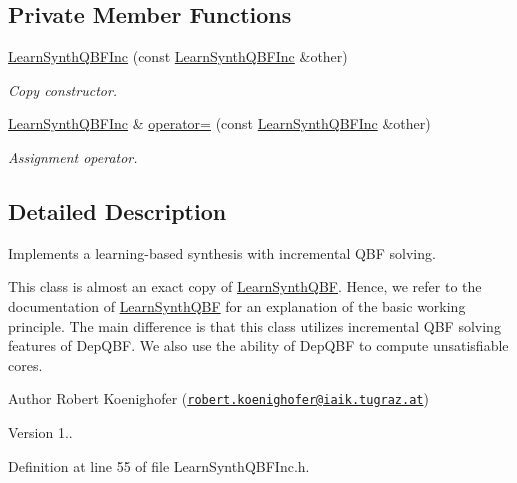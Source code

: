 \subsection*{Private Member Functions}
\begin{DoxyCompactItemize}
\item 
\hyperlink{classLearnSynthQBFInc_adbb7481fd8c287942417c9ae75b06e8b}{Learn\-Synth\-Q\-B\-F\-Inc} (const \hyperlink{classLearnSynthQBFInc}{Learn\-Synth\-Q\-B\-F\-Inc} \&other)
\begin{DoxyCompactList}\small\item\em Copy constructor. \end{DoxyCompactList}\item 
\hyperlink{classLearnSynthQBFInc}{Learn\-Synth\-Q\-B\-F\-Inc} \& \hyperlink{classLearnSynthQBFInc_a09bc59c4c8a80e064fe4535314ee2acb}{operator=} (const \hyperlink{classLearnSynthQBFInc}{Learn\-Synth\-Q\-B\-F\-Inc} \&other)
\begin{DoxyCompactList}\small\item\em Assignment operator. \end{DoxyCompactList}\end{DoxyCompactItemize}


\subsection{Detailed Description}
Implements a learning-\/based synthesis with incremental Q\-B\-F solving. 

This class is almost an exact copy of \hyperlink{classLearnSynthQBF}{Learn\-Synth\-Q\-B\-F}. Hence, we refer to the documentation of \hyperlink{classLearnSynthQBF}{Learn\-Synth\-Q\-B\-F} for an explanation of the basic working principle. The main difference is that this class utilizes incremental Q\-B\-F solving features of Dep\-Q\-B\-F. We also use the ability of Dep\-Q\-B\-F to compute unsatisfiable cores.

\begin{DoxyAuthor}{Author}
Robert Koenighofer (\href{mailto:robert.koenighofer@iaik.tugraz.at}{\tt robert.\-koenighofer@iaik.\-tugraz.\-at}) 
\end{DoxyAuthor}
\begin{DoxyVersion}{Version}
1.. 
\end{DoxyVersion}


Definition at line 55 of file Learn\-Synth\-Q\-B\-F\-Inc.\-h.



